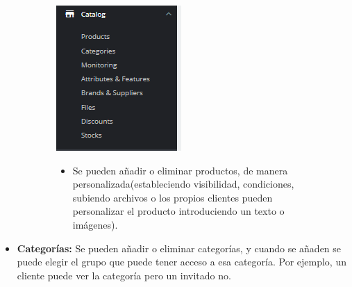 \documentclass{article}
\begin{document}
\begin{figure}[h!]
        \raggedright
        \begin{subfigure}[!]{0.2\textwidth} 
            \includegraphics[width=\textwidth]{images/catalog.png}
        \end{subfigure}       
        \begin{subfigure}[!]{0.7\textwidth} 
            \begin{itemize}
\item[\triangleright]  Se pueden añadir o eliminar productos, de manera personalizada(estableciendo visibilidad, condiciones, subiendo archivos o los propios clientes pueden personalizar el producto introduciendo un texto o imágenes).
\end{itemize}            
        \end{subfigure}
    \end{figure}
    
\begin{itemize}
				\item[\triangleright] \textbf{Categorías:} Se pueden añadir o eliminar categorías, y cuando se añaden se puede elegir el grupo que puede tener acceso a esa categoría. Por ejemplo, un cliente puede ver la categoría pero un invitado no.
			\end{itemize}
\end{document}
